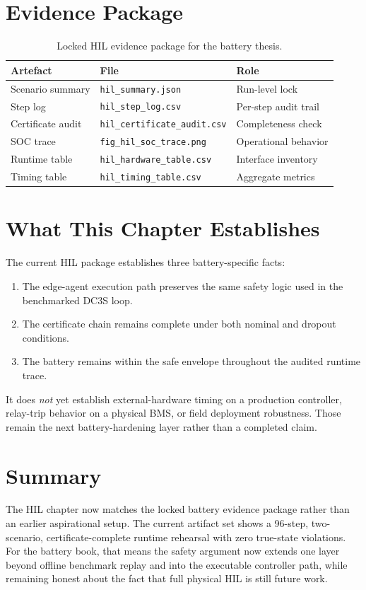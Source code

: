 \section{Evidence Package}

\begin{table}[ht]
\centering
\caption{Locked HIL evidence package for the battery thesis.}
\label{tab:hil-evidence}
\begin{tabular}{lll}
\toprule
\textbf{Artefact} & \textbf{File} & \textbf{Role} \\
\midrule
Scenario summary & \texttt{hil\_summary.json} & Run-level lock \\
Step log & \texttt{hil\_step\_log.csv} & Per-step audit trail \\
Certificate audit & \texttt{hil\_certificate\_audit.csv} & Completeness check \\
SOC trace & \texttt{fig\_hil\_soc\_trace.png} & Operational behavior \\
Runtime table & \texttt{hil\_hardware\_table.csv} & Interface inventory \\
Timing table & \texttt{hil\_timing\_table.csv} & Aggregate metrics \\
\bottomrule
\end{tabular}
\end{table}

\section{What This Chapter Establishes}

The current HIL package establishes three battery-specific facts:

\begin{enumerate}
  \item The edge-agent execution path preserves the same safety logic used in
    the benchmarked DC3S loop.
  \item The certificate chain remains complete under both nominal and dropout
    conditions.
  \item The battery remains within the safe envelope throughout the audited
    runtime trace.
\end{enumerate}

It does \emph{not} yet establish external-hardware timing on a production
controller, relay-trip behavior on a physical BMS, or field deployment
robustness.  Those remain the next battery-hardening layer rather than a
completed claim.

\section{Summary}

The HIL chapter now matches the locked battery evidence package rather than
an earlier aspirational setup.  The current artifact set shows a 96-step,
two-scenario, certificate-complete runtime rehearsal with zero true-state
violations.  For the battery book, that means the safety argument now extends
one layer beyond offline benchmark replay and into the executable controller
path, while remaining honest about the fact that full physical HIL is still
future work.
